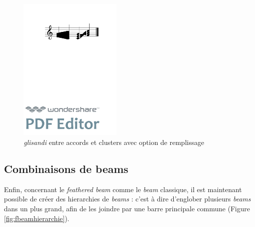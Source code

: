 \documentclass{article}
\newenvironment{gmncode}	{\vspace{-2mm}\small\verbatim}{\endverbatim\vspace{-2mm}}
\begin{document}
\begin{figure}[h]
\begin{center}
\begin{gmncode}
[ 
  \glissando<fill="true", dx1=-2, dx2=2, 
   thickness=2.2>(\cluster({e,g} {c,b}))
  \glissando<fill="true">({c,e,g} {a,c2,f1}) 
]
\end{gmncode}

\includegraphics[width=5cm]{img/glissandofill.pdf}
\caption{\emph{glisandi} entre accords et clusters avec option de remplissage}
\label{fig:glissandofill}
\end{center}
\end{figure}

\subsection{Combinaisons de beams}\label{subsec:combinaisonBeams}


Enfin, concernant le \emph{feathered beam} comme le \emph{beam} classique, il est maintenant possible de créer des hierarchies de \emph{beams} : c'est à dire d'englober plusieurs \emph{beams} dans un plus grand, afin de les joindre par une barre principale commune (Figure \ref{fig:fbeamhierarchie}).
\end{document}
